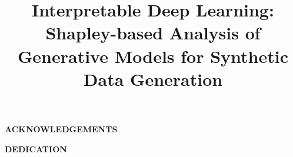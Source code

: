 \documentclass{article}
\title{Interpretable Deep Learning: Shapley-based Analysis of Generative Models for Synthetic Data Generation}
\begin{document}







\thispagestyle{empty}

\newpage

\begin{center}
\Large\textbf{ACKNOWLEDGEMENTS}
\end{center}

\vspace{1em} %

\newpage

\begin{center}
\Large\textbf{DEDICATION}
\end{center}
\end{document}
